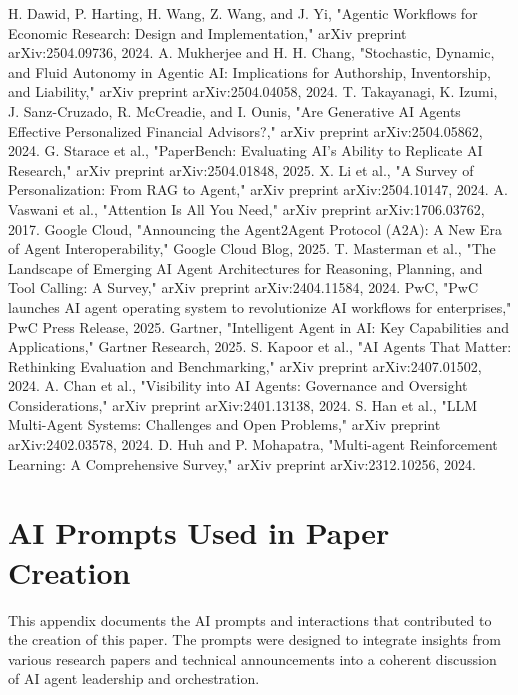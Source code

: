 \documentclass[conference]{IEEEtran}
\begin{document}
\begin{thebibliography}{00}
 H. Dawid, P. Harting, H. Wang, Z. Wang, and J. Yi, "Agentic Workflows for Economic Research: Design and Implementation," arXiv preprint arXiv:2504.09736, 2024.
 A. Mukherjee and H. H. Chang, "Stochastic, Dynamic, and Fluid Autonomy in Agentic AI: Implications for Authorship, Inventorship, and Liability," arXiv preprint arXiv:2504.04058, 2024.
 T. Takayanagi, K. Izumi, J. Sanz-Cruzado, R. McCreadie, and I. Ounis, "Are Generative AI Agents Effective Personalized Financial Advisors?," arXiv preprint arXiv:2504.05862, 2024.
 G. Starace et al., "PaperBench: Evaluating AI's Ability to Replicate AI Research," arXiv preprint arXiv:2504.01848, 2025.
 X. Li et al., "A Survey of Personalization: From RAG to Agent," arXiv preprint arXiv:2504.10147, 2024.
 A. Vaswani et al., "Attention Is All You Need," arXiv preprint arXiv:1706.03762, 2017.
 Google Cloud, "Announcing the Agent2Agent Protocol (A2A): A New Era of Agent Interoperability," Google Cloud Blog, 2025.
 T. Masterman et al., "The Landscape of Emerging AI Agent Architectures for Reasoning, Planning, and Tool Calling: A Survey," arXiv preprint arXiv:2404.11584, 2024.
 PwC, "PwC launches AI agent operating system to revolutionize AI workflows for enterprises," PwC Press Release, 2025.
 Gartner, "Intelligent Agent in AI: Key Capabilities and Applications," Gartner Research, 2025.
 S. Kapoor et al., "AI Agents That Matter: Rethinking Evaluation and Benchmarking," arXiv preprint arXiv:2407.01502, 2024.
 A. Chan et al., "Visibility into AI Agents: Governance and Oversight Considerations," arXiv preprint arXiv:2401.13138, 2024.
 S. Han et al., "LLM Multi-Agent Systems: Challenges and Open Problems," arXiv preprint arXiv:2402.03578, 2024.
 D. Huh and P. Mohapatra, "Multi-agent Reinforcement Learning: A Comprehensive Survey," arXiv preprint arXiv:2312.10256, 2024.
\end{thebibliography}

\appendix
\section{AI Prompts Used in Paper Creation}
This appendix documents the AI prompts and interactions that contributed to the creation of this paper. The prompts were designed to integrate insights from various research papers and technical announcements into a coherent discussion of AI agent leadership and orchestration.
\end{document}

